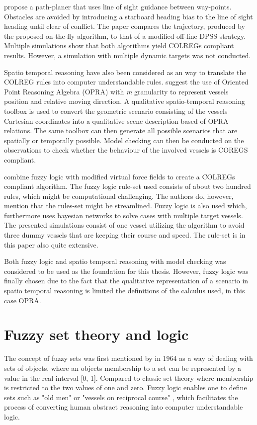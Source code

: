 \textcite{naeem2012colregs}
propose a path-planer that uses line of sight guidance between way-points. Obstacles are avoided by introducing a starboard heading bias to the line of sight heading until clear of conflict. The paper compares the trajectory, produced by the proposed on-the-fly algorithm, to that of a modified off-line DPSS strategy. Multiple simulations show that both algorithms yield COLREGs compliant results. However, a simulation with multiple dynamic targets was not conducted.

Spatio temporal reasoning have also been considered as an way to translate the COLREG rules into computer understandable rules. \textcite{spat_temp1,spat_temp2}
suggest the use of Oriented Point Reasoning Algebra (OPRA) with \textit{m}  granularity to represent vessels position and relative moving direction.
A qualitative spatio-temporal reasoning toolbox is used to convert the geometric scenario consisting of the vessels Cartesian coordinates into a qualitative scene description based of OPRA relations. The same toolbox can then generate all possible scenarios that are spatially or temporally possible. Model checking can then be conducted on the  observations to check whether the behaviour of the involved vessels is  COREGS compliant.


\textcite{lee2004fuzzy} combine fuzzy logic with modified virtual force fields to  create a COLREGs compliant algorithm. The fuzzy logic rule-set used consists of about two hundred rules, which might be computational challenging. The authors do, however, mention that the rules-set might be streamlined. Fuzzy logic is also used \textcite{perera2012intelligent} which, furthermore uses bayesian networks to solve cases with multiple target vessels. The presented simulations consist of one vessel utilizing the algorithm to avoid three dummy vessels that are keeping their course and speed. The rule-set is in this paper also quite extensive.


Both fuzzy logic and spatio temporal reasoning with model checking was considered to be used as the foundation for this thesis. However, fuzzy logic was finally chosen due to the fact that the qualitative representation of a scenario in spatio temporal reasoning is limited the definitions of the calculus used, in this case OPRA.
\chapter{Fuzzy set theory and logic}
The concept of fuzzy sets was first mentioned by \textcite{zadeh1996fuzzy} in 1964 as a way of dealing with sets of objects, where an objects membership to a set can be represented by a value in the real interval [0, 1]. Compared to classic set theory where  membership is restricted to the two values of one and zero. Fuzzy logic enables one to define sets such as "old men" or "vessels on reciprocal course" \cite{zadeh1996fuzzy}, which facilitates the process of converting human abstract reasoning into computer understandable logic.
